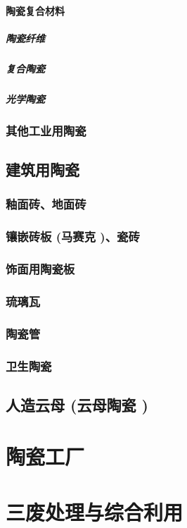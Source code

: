 \documentclass[UTF8]{../../ApplicationUniverse}
\begin{document}
            \paragraph{陶瓷复合材料}
                \subparagraph{陶瓷纤维}
                \subparagraph{复合陶瓷}
                \subparagraph{光学陶瓷}
        \subsubsection{其他工业用陶瓷}
    \subsection{建筑用陶瓷}
        \subsubsection{釉面砖、地面砖}
        \subsubsection{镶嵌砖板 (马赛克 )、瓷砖}
        \subsubsection{饰面用陶瓷板}
        \subsubsection{琉璃瓦}
        \subsubsection{陶瓷管}
        \subsubsection{卫生陶瓷}
    \subsection{人造云母 (云母陶瓷 )}
\section{陶瓷工厂}
\section{三废处理与综合利用}
\end{document}

